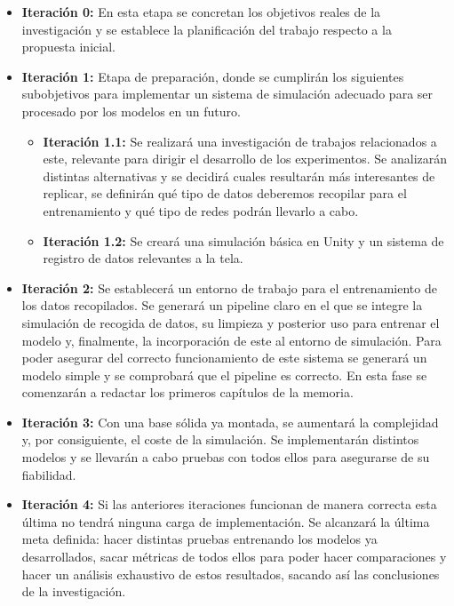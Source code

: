 \begin{itemize}
\item \textbf{Iteración 0:} En esta etapa se concretan los objetivos reales de la investigación y se establece la planificación del trabajo respecto a la propuesta inicial.

\item \textbf{Iteración 1:} Etapa de preparación, donde se cumplirán los siguientes subobjetivos para implementar un sistema de simulación adecuado para ser procesado por los modelos en un futuro.
	\begin{itemize}
        \item \textbf{Iteración 1.1:} Se realizará una investigación de trabajos relacionados a este, relevante para dirigir el desarrollo de los experimentos. Se analizarán distintas alternativas y se decidirá cuales resultarán más interesantes de replicar, se definirán qué tipo de datos deberemos recopilar para el entrenamiento y qué tipo de redes podrán llevarlo a cabo.
   		\item \textbf{Iteración 1.2:} Se creará una simulación básica en Unity y un sistema de registro de datos relevantes a la tela.
   	\end{itemize}
\item \textbf{Iteración 2:} Se establecerá un entorno de trabajo para el entrenamiento de los datos recopilados. Se generará un pipeline claro en el que se integre la simulación de recogida de datos, su limpieza y posterior uso para entrenar el modelo y, finalmente, la incorporación de este al entorno de simulación. Para poder asegurar del correcto funcionamiento de este sistema se generará un modelo simple y se comprobará que el pipeline es correcto. En esta fase se comenzarán a redactar los primeros capítulos de la memoria.

\item \textbf{Iteración 3:} Con una base sólida ya montada, se aumentará la complejidad y, por consiguiente, el coste de la simulación. Se implementarán distintos modelos y se llevarán a cabo pruebas con todos ellos para asegurarse de su fiabilidad.

\item \textbf{Iteración 4:} Si las anteriores iteraciones funcionan de manera correcta esta última no tendrá ninguna carga de implementación. Se alcanzará la última meta definida: hacer distintas pruebas entrenando los modelos ya desarrollados, sacar métricas de todos ellos para poder hacer comparaciones y hacer un análisis exhaustivo de estos resultados, sacando así las conclusiones de la investigación.
\end{itemize}

